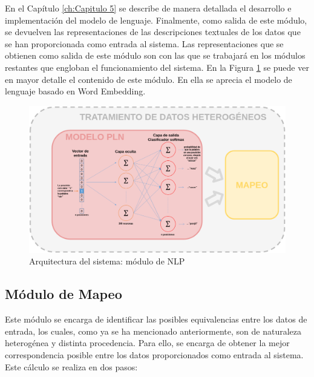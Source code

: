 En el Capítulo \ref{ch:Capitulo 5} se describe de manera detallada el desarrollo e implementación del modelo de lenguaje. Finalmente, como salida de este módulo, se devuelven las representaciones de las descripciones textuales de los datos que se han proporcionada como entrada al sistema. Las representaciones que se obtienen como salida de este módulo son con las que se trabajará en los módulos restantes que engloban el funcionamiento del sistema. En la Figura \ref{fig:arq_modelo_nlp} se puede ver en mayor detalle el contenido de este módulo. En ella se aprecia el modelo de lenguaje basado en Word Embedding.

\begin{figure}[H]
    \centering
    \includegraphics[width=1.0\textwidth]{imagenes/arquitectura/wembedding.png}
    \caption{Arquitectura del sistema: módulo de NLP}
    \label{fig:arq_modelo_nlp}
\end{figure}

\subsection{Módulo de Mapeo}

Este módulo se encarga de identificar las posibles equivalencias entre los datos de entrada, los cuales, como ya se ha mencionado anteriormente, son de naturaleza heterogénea y distinta procedencia. Para ello, se encarga de obtener la mejor correspondencia posible entre los datos proporcionados como entrada al sistema. Este cálculo se realiza en dos pasos:

